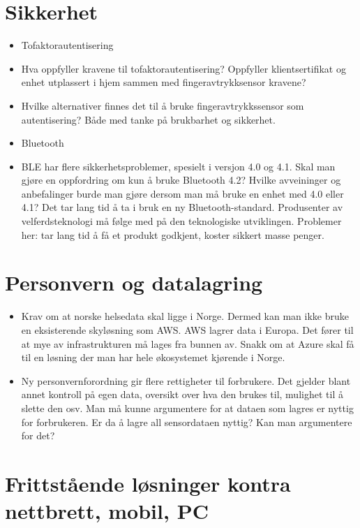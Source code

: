 \section{Sikkerhet}\label{sikkerhet}

\begin{itemize}
\tightlist
\item
  Tofaktorautentisering
\item
  Hva oppfyller kravene til tofaktorautentisering? Oppfyller
  klientsertifikat og enhet utplassert i hjem sammen med
  fingeravtrykksensor kravene?
\item
  Hvilke alternativer finnes det til å bruke fingeravtrykkssensor som
  autentisering? Både med tanke på brukbarhet og sikkerhet.
\item
  Bluetooth
\item
  BLE har flere sikkerhetsproblemer, spesielt i versjon 4.0 og 4.1. Skal
  man gjøre en oppfordring om kun å bruke Bluetooth 4.2? Hvilke
  avveininger og anbefalinger burde man gjøre dersom man må bruke en
  enhet med 4.0 eller 4.1? Det tar lang tid å ta i bruk en ny
  Bluetooth-standard. Produsenter av velferdsteknologi må følge med på
  den teknologiske utviklingen. Problemer her: tar lang tid å få et
  produkt godkjent, koster sikkert masse penger.
\end{itemize}

\section{Personvern og datalagring}\label{personvern-og-datalagring}

\begin{itemize}
\tightlist
\item
  Krav om at norske helsedata skal ligge i Norge. Dermed kan man ikke
  bruke en eksisterende skyløsning som AWS. AWS lagrer data i Europa.
  Det fører til at mye av infrastrukturen må lages fra bunnen av. Snakk
  om at Azure skal få til en løsning der man har hele økosystemet
  kjørende i Norge.
\item
  Ny personvernforordning gir flere rettigheter til forbrukere. Det
  gjelder blant annet kontroll på egen data, oversikt over hva den
  brukes til, mulighet til å slette den osv. Man må kunne argumentere
  for at dataen som lagres er nyttig for forbrukeren. Er da å lagre all
  sensordataen nyttig? Kan man argumentere for det?
\end{itemize}

\section{Frittstående løsninger kontra nettbrett, mobil,
PC}\label{frittstuxe5ende-luxf8sninger-kontra-nettbrett-mobil-pc}

